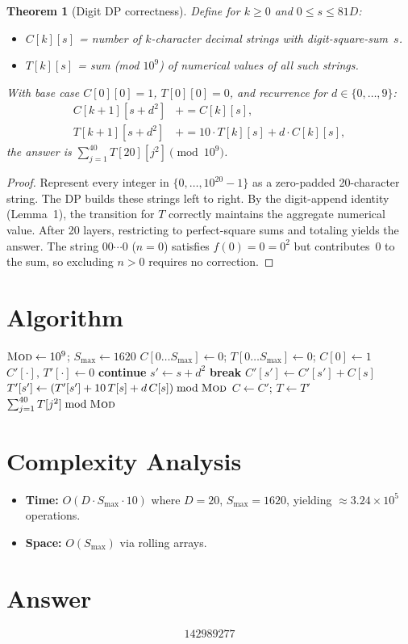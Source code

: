 \documentclass[11pt]{article}
\newtheorem{theorem}{Theorem}
\begin{document}
\begin{theorem}[Digit DP correctness]
Define for $k \geq 0$ and $0 \leq s \leq 81D$:
\begin{itemize}
    \item $C[k][s]$ = number of $k$-character decimal strings with digit-square-sum~$s$.
    \item $T[k][s]$ = sum (mod $10^9$) of numerical values of all such strings.
\end{itemize}
With base case $C[0][0] = 1$, $T[0][0] = 0$, and recurrence for $d \in \{0,\ldots,9\}$:
\begin{align}
C[k+1][s + d^2] &\mathrel{+}= C[k][s], \\
T[k+1][s + d^2] &\mathrel{+}= 10 \cdot T[k][s] + d \cdot C[k][s],
\end{align}
the answer is $\sum_{j=1}^{40} T[20][j^2] \pmod{10^9}$.
\end{theorem}

\begin{proof}
Represent every integer in $\{0,\ldots,10^{20}-1\}$ as a zero-padded 20-character string. The DP builds these strings left to right. By the digit-append identity (Lemma~1), the transition for $T$ correctly maintains the aggregate numerical value. After 20 layers, restricting to perfect-square sums and totaling yields the answer. The string $00\cdots0$ ($n=0$) satisfies $f(0) = 0 = 0^2$ but contributes~0 to the sum, so excluding $n > 0$ requires no correction.
\end{proof}

\section{Algorithm}

\begin{algorithmic}[1]
\State $\textsc{Mod} \gets 10^9$; $S_{\max} \gets 1620$
\State $C[0 \ldots S_{\max}] \gets 0$; $T[0 \ldots S_{\max}] \gets 0$; $C[0] \gets 1$
    \State $C'[\cdot],\, T'[\cdot] \gets 0$
         \textbf{continue} \EndIf
            \State $s' \gets s + d^2$
             \textbf{break} \EndIf
            \State $C'[s'] \gets C'[s'] + C[s]$
            \State $T'[s'] \gets (T'[s'] + 10\,T[s] + d\,C[s]) \bmod \textsc{Mod}$
        \EndFor
    \EndFor
    \State $C \gets C'$; $T \gets T'$
\EndFor
\State \Return $\sum_{j=1}^{40} T[j^2] \bmod \textsc{Mod}$
\end{algorithmic}

\section{Complexity Analysis}

\begin{itemize}
    \item \textbf{Time:} $O(D \cdot S_{\max} \cdot 10)$ where $D=20$, $S_{\max}=1620$, yielding $\approx 3.24 \times 10^5$ operations.
    \item \textbf{Space:} $O(S_{\max})$ via rolling arrays.
\end{itemize}

\section{Answer}

\[
\boxed{142989277}
\]
\end{document}
